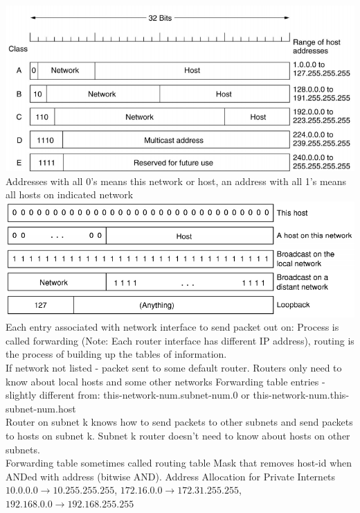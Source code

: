 \documentclass[number]{notes}
\begin{document}
\begin{landscape}
\begin{multicols}{3}
\includegraphics[width=\linewidth]{classes.png}
Addresses with all 0's means this network or host, an address with all 1's means all hosts on indicated network
\includegraphics[width=\linewidth]{specialIP.png}
Each entry associated with network interface to send packet out on: Process is called forwarding (Note: Each router interface has different IP address), routing is the process of building up the tables of information.\\
If network not listed - packet sent to some default router. Routers only need to know about local hosts and some other networks
Forwarding table entries - slightly different from: this-network-num.subnet-num.0 or this-network-num.this-subnet-num.host\\
Router on subnet k knows how to send packets to other subnets and send packets to hosts on subnet k. Subnet k router doesn't need to know about hosts on other subnets.\\
Forwarding table sometimes called routing table
Mask that removes host-id when ANDed with address (bitwise AND).
Address Allocation for Private Internets\\
$10.0.0.0\rightarrow10.255.255.255$,
$172.16.0.0\rightarrow172.31.255.255$,
$192.168.0.0\rightarrow192.168.255.255$

\end{multicols}
\end{landscape}
\end{document}
